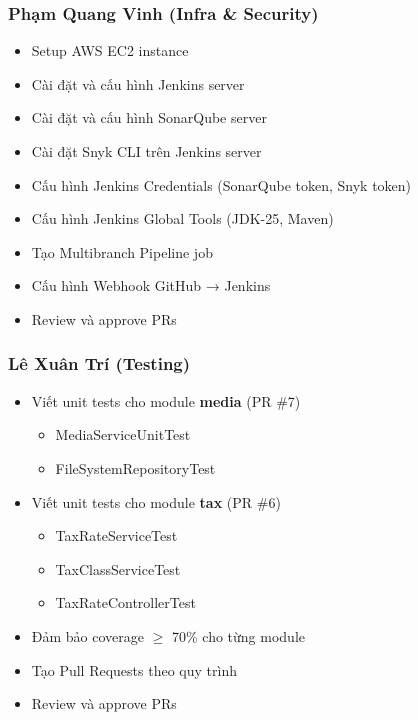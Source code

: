 \subsubsection{Phạm Quang Vinh (Infra \& Security)}
\begin{itemize}[noitemsep]
    \item Setup AWS EC2 instance
    \item Cài đặt và cấu hình Jenkins server
    \item Cài đặt và cấu hình SonarQube server
    \item Cài đặt Snyk CLI trên Jenkins server
    \item Cấu hình Jenkins Credentials (SonarQube token, Snyk token)
    \item Cấu hình Jenkins Global Tools (JDK-25, Maven)
    \item Tạo Multibranch Pipeline job
    \item Cấu hình Webhook GitHub → Jenkins
    \item Review và approve PRs
\end{itemize}

\subsubsection{Lê Xuân Trí (Testing)}
\begin{itemize}[noitemsep]
    \item Viết unit tests cho module \textbf{media} (PR \#7)
    \begin{itemize}
        \item MediaServiceUnitTest
        \item FileSystemRepositoryTest
    \end{itemize}
    \item Viết unit tests cho module \textbf{tax} (PR \#6)
    \begin{itemize}
        \item TaxRateServiceTest
        \item TaxClassServiceTest
        \item TaxRateControllerTest
    \end{itemize}
    \item Đảm bảo coverage $\geq$ 70\% cho từng module
    \item Tạo Pull Requests theo quy trình
    \item Review và approve PRs
\end{itemize}


